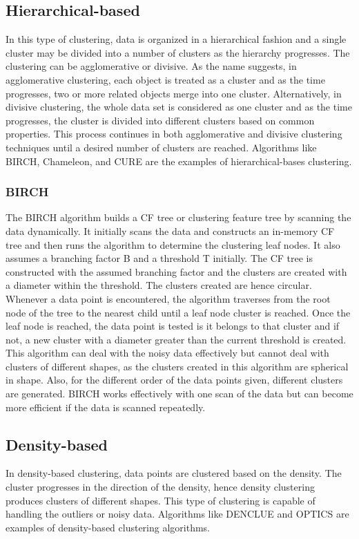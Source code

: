 \documentclass[sigconf]{acmart}
\begin{document}
\subsection{Hierarchical-based}
In this type of clustering, data is organized in a hierarchical fashion and a single cluster may be divided into a number of clusters as the hierarchy progresses. The clustering can be agglomerative or divisive. As the name suggests, in agglomerative clustering, each object is treated as a cluster and as the time progresses, two or more related objects merge into one cluster. Alternatively, in divisive clustering, the whole data set is considered as one cluster and as the time progresses, the cluster is divided into different clusters based on common properties. This process continues in both agglomerative and divisive clustering techniques until a desired number of clusters are reached. Algorithms like BIRCH, Chameleon, and CURE  are the examples of hierarchical-bases clustering.  
\subsubsection{BIRCH}
The BIRCH algorithm\cite{Zhang1996} builds a CF tree or clustering feature tree by scanning the data dynamically. It initially scans the data and constructs an in-memory CF tree and then runs the algorithm to determine the clustering leaf nodes. It also assumes a branching factor B and a threshold T initially. The CF tree is constructed with the assumed branching factor and the clusters are created with a diameter within the threshold. The clusters created are hence circular. Whenever a data point is encountered, the algorithm traverses from the root node of the tree to the nearest child until a leaf node cluster is reached. Once the leaf node is reached, the data point is tested is it belongs to that cluster and if not, a new cluster with a diameter greater than the current threshold is created. This algorithm can deal with the noisy data effectively but cannot deal with clusters of different shapes, as the clusters created in this algorithm are spherical in shape. Also, for the different order of the data points given, different clusters are generated. BIRCH works effectively with one scan of the data but can become more efficient if the data is scanned repeatedly.  

\subsection{Density-based}
In density-based clustering, data points are clustered based on the density. The cluster progresses in the direction of the density, hence density clustering produces clusters of different shapes. This type of clustering is capable of handling the outliers or noisy data. Algorithms like DENCLUE and OPTICS are examples of density-based clustering algorithms.
\end{document}
